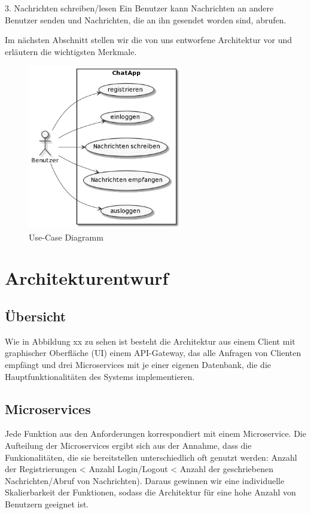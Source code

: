 3. Nachrichten schreiben/lesen
Ein Benutzer kann Nachrichten an andere Benutzer senden und Nachrichten, die an ihn gesendet worden sind, abrufen.


Im nächsten Abschnitt stellen wir die von uns entworfene Architektur vor und erläutern die wichtigsten Merkmale. 

\begin{figure}[bth] 
	\centering
	\includegraphics[width=0.6\textwidth]{Graphics/Usecase-Diagramm.png}
	\caption{Use-Case Diagramm}
\end{figure}

\section{Architekturentwurf}

\subsection{Übersicht}
Wie in Abbildung xx zu sehen ist besteht die Architektur aus einem Client mit graphischer Oberfläche (UI) einem API-Gateway, das alle Anfragen von Clienten empfängt und drei Microservices mit je einer eigenen Datenbank, die die Hauptfunktionalitäten des Systems implementieren.

\subsection{Microservices}
Jede Funktion aus den Anforderungen korrespondiert mit einem Microservice. Die Aufteilung der Microservices ergibt sich aus der Annahme, dass die Funkionalitäten, die sie bereitstellen unterschiedlich oft genutzt werden: Anzahl der Registrierungen < Anzahl Login/Logout < Anzahl der geschriebenen Nachrichten/Abruf von Nachrichten). Daraus gewinnen wir eine individuelle Skalierbarkeit der Funktionen, sodass die Architektur für eine hohe Anzahl von Benutzern geeignet ist.

